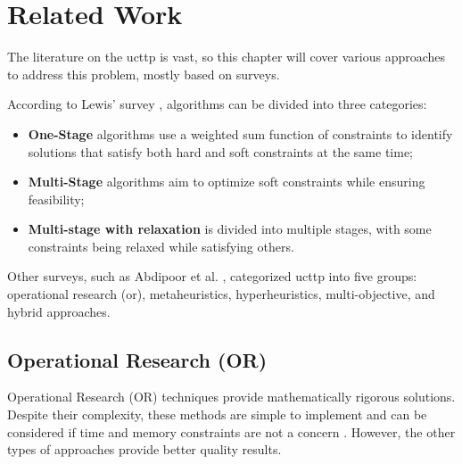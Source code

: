 
\chapter{Related Work}


\label{Related Work}

The literature on the \ac{ucttp} is vast, so this chapter will cover various approaches to address this problem, mostly based on surveys.

According to Lewis' survey \cite{lewis_survey_2008}, algorithms can be divided into three categories:

\begin{itemize}
	\item \textbf{One-Stage} algorithms use a weighted sum function of constraints to identify solutions that satisfy both hard and soft constraints at the same time;
	\item \textbf{Multi-Stage} algorithms aim to optimize soft constraints while ensuring feasibility;
	\item \textbf{Multi-stage with relaxation} is divided into multiple stages, with some constraints being relaxed while satisfying others.
\end{itemize}

Other surveys, such as Abdipoor et al. \cite{abdipoor_meta-heuristic_2023}, categorized \ac{ucttp} into five groups: operational research (or), metaheuristics, hyperheuristics, multi-objective, and hybrid approaches.

\section{Operational Research (OR)}

Operational Research (OR) techniques provide mathematically rigorous solutions. Despite their complexity, these methods are simple to implement and can be considered if time and memory constraints are not a concern \cite{babaei_survey_2015}. However, the other types of approaches provide better quality results. 

